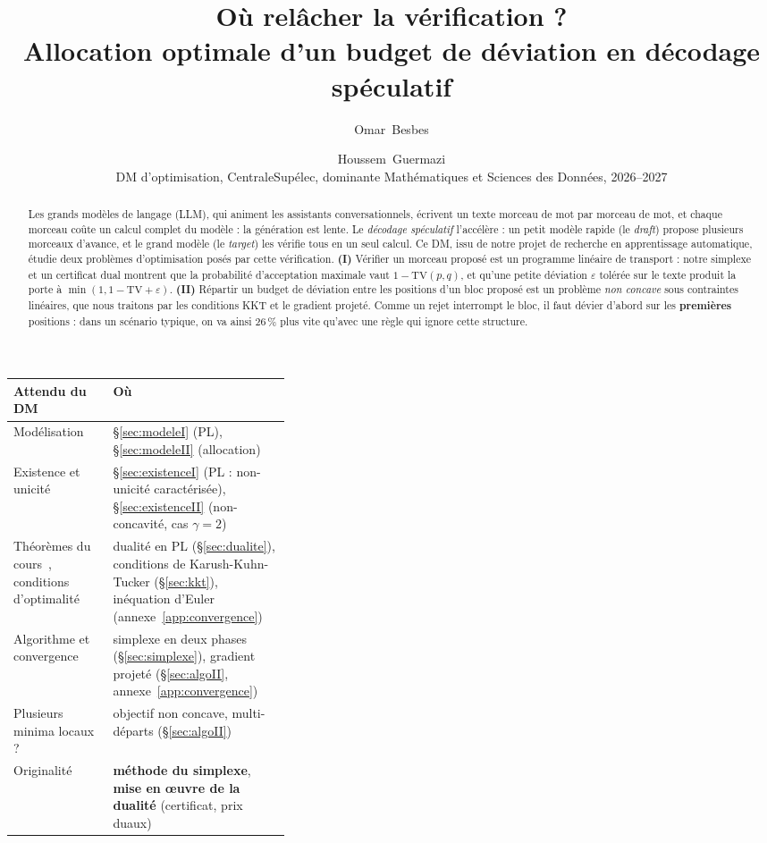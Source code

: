 \documentclass[11pt,a4paper]{article}
\title{\textbf{Où relâcher la vérification ?}\\[2pt]
\large Allocation optimale d'un budget de déviation en décodage spéculatif}
\author{Omar~Besbes \and Houssem~Guermazi\\[2pt]
\small DM d'optimisation, CentraleSupélec, dominante Mathématiques et Sciences des Données, 2026--2027}
\date{}
\newcommand{\TV}{\mathrm{TV}}
\theoremstyle{plain}
\begin{document}
\maketitle

\begin{abstract}
Les grands modèles de langage (LLM), qui animent les assistants conversationnels, écrivent un texte morceau de mot par morceau de mot, et chaque morceau coûte un calcul complet du modèle : la génération est lente.
Le \emph{décodage spéculatif} l'accélère : un petit modèle rapide (le \emph{draft}) propose plusieurs morceaux d'avance, et le grand modèle (le \emph{target}) les vérifie tous en un seul calcul.
Ce DM, issu de notre projet de recherche en apprentissage automatique, étudie deux problèmes d'optimisation posés par cette vérification.
\textbf{(I)} Vérifier un morceau proposé est un programme linéaire de transport : notre simplexe et un certificat dual montrent que la probabilité d'acceptation maximale vaut $1-\TV(p,q)$, et qu'une petite déviation $\varepsilon$ tolérée sur le texte produit la porte à $\min(1,1-\TV+\varepsilon)$.
\textbf{(II)} Répartir un budget de déviation entre les positions d'un bloc proposé est un problème \emph{non concave} sous contraintes linéaires, que nous traitons par les conditions KKT et le gradient projeté.
Comme un rejet interrompt le bloc, il faut dévier d'abord sur les \textbf{premières} positions : dans un scénario typique, on va ainsi 26\,\% plus vite qu'avec une règle qui ignore cette structure.
\end{abstract}

\begin{center}
\small
\begin{tabularx}{\linewidth}{@{}>{\raggedright}p{0.36\linewidth}X@{}}
\toprule
\textbf{Attendu du DM} & \textbf{Où} \\\midrule
Modélisation & §\ref{sec:modeleI} (PL), §\ref{sec:modeleII} (allocation)\\
Existence et unicité & §\ref{sec:existenceI} (PL : non-unicité caractérisée), §\ref{sec:existenceII} (non-concavité, cas $\gamma=2$)\\
Théorèmes du cours~\cite{allaire}, conditions d'optimalité & dualité en PL (§\ref{sec:dualite}), conditions de Karush-Kuhn-Tucker (§\ref{sec:kkt}), inéquation d'Euler (annexe~\ref{app:convergence})\\
Algorithme et convergence & simplexe en deux phases (§\ref{sec:simplexe}), gradient projeté (§\ref{sec:algoII}, annexe~\ref{app:convergence})\\
Plusieurs minima locaux ? & objectif non concave, multi-départs (§\ref{sec:algoII})\\
Originalité & \textbf{méthode du simplexe}, \textbf{mise en œuvre de la dualité} (certificat, prix duaux)\\
\bottomrule
\end{tabularx}
\end{center}
\end{document}
